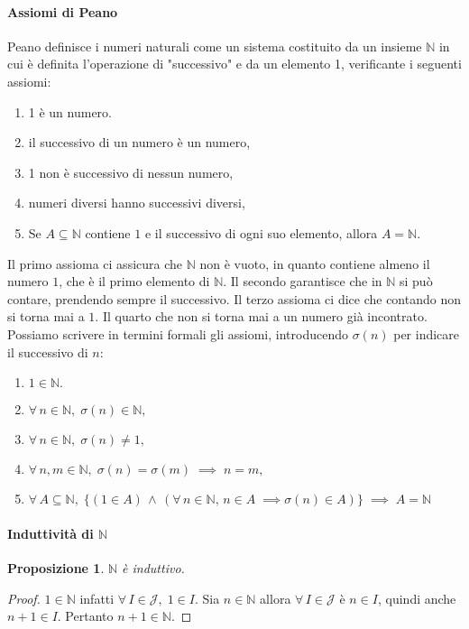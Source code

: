 \documentclass{article}
\theoremstyle{plain}
\newtheorem{prop}[thm]{Proposizione}
\theoremstyle{definition}
\theoremstyle{remark}
\begin{document}
\paragraph{Assiomi di Peano}
\begin{bxthm}
Peano definisce i numeri naturali come un sistema costituito da un insieme $\mathbb{N}$ in cui è definita l'operazione di "successivo" e da un elemento 1, verificante i seguenti assiomi:
\begin{enumerate}
    \item 1 è un numero.
    \item il successivo di un numero è un numero,
    \item 1 non è successivo di nessun numero,
    \item numeri diversi hanno successivi diversi,
    \item Se $A\subseteq\mathbb{N}$ contiene $1$ e il successivo di ogni suo elemento, allora $A=\mathbb{N}$.
\end{enumerate}
Il primo assioma ci assicura che $\mathbb{N}$ non è vuoto, in quanto contiene almeno il numero $1$, che è il primo elemento di $\mathbb{N}$.
Il secondo garantisce che in $\mathbb{N}$ si può contare, prendendo sempre il successivo. 
Il terzo assioma ci dice che contando non si torna mai a $1$.
Il quarto che non si torna mai a un numero già incontrato.
Possiamo scrivere in termini formali gli assiomi, introducendo $\sigma(n)$ per indicare il successivo di $n$:
\begin{enumerate}
    \item $1\in\mathbb{N}.$
    \item $\forall\, n\in\mathbb{N},\;\sigma(n)\in\mathbb{N},$
    \item $\forall\, n\in\mathbb{N},\; \sigma(n)\neq 1,$
    \item $\forall\,n,m\in\mathbb{N},\;\sigma(n)=\sigma(m)\;\implies\; n=m,$
    \item $\forall\,A\subseteq\mathbb{N},\;\{(1\in A)\,\land\,(\forall\,n\in\mathbb{N},\,n\in A\;\implies \sigma(n)\in A)\}\;\implies\;A=\mathbb{N}$
\end{enumerate}
\end{bxthm}

\vspace{10pt}

\paragraph{Induttività di $\mathbb{N}$}
\begin{bxthm}
\begin{prop}
    $\mathbb{N}$ è induttivo.
\end{prop}
\end{bxthm}
\begin{proof}
    $1\in\mathbb{N}$ infatti $\forall\, I\in \mathcal{J},\;1\in I$.
    Sia $n\in\mathbb{N}$ allora $\forall\, I\in \mathcal{J}$ è $n\in I$, quindi anche $n+1\in I$.
    Pertanto $n+1\in\mathbb{N}$.
\end{proof}
\end{document}
